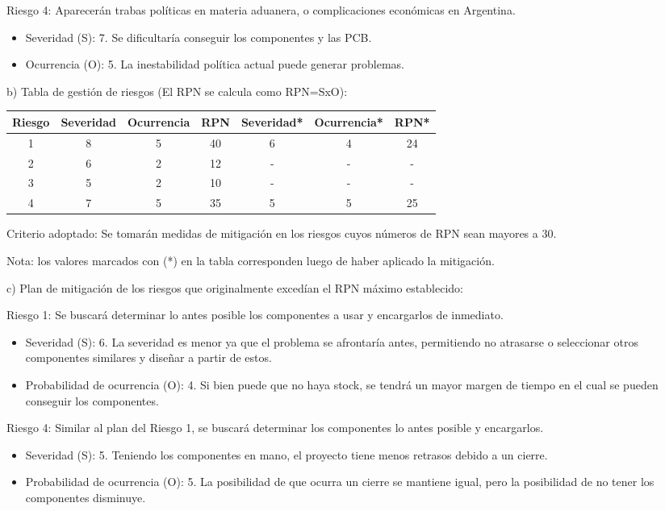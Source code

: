 \documentclass[
11pt, %
codirector, %
]{charter}
\begin{document}
Riesgo 4: Aparecerán trabas políticas en materia aduanera, o complicaciones económicas en Argentina.
\begin{itemize}
	\item Severidad (S): 7. Se dificultaría conseguir los componentes y las PCB.
	\item Ocurrencia (O): 5. La inestabilidad política actual puede generar problemas.
\end{itemize}

b) Tabla de gestión de riesgos (El RPN se calcula como RPN=SxO): 

\begin{table}[htpb]
\centering
\begin{tabular}{|c|c|c|c|c|c|c|}
\hline
\rowcolor[HTML]{C0C0C0} 
Riesgo & Severidad & Ocurrencia & RPN & Severidad* & Ocurrencia* & RPN* \\ \hline
    1  & 8  & 5  &  40   &  6  & 4   & 24     \\ \hline
    2  & 6  & 2  &  12   &  -  &  -  & -    \\ \hline
    3  & 5  & 2  &  10   &  -  &  -  & -     \\ \hline
    4  & 7  & 5  &  35   &  5  &  5  & 25     \\ \hline
\end{tabular}%
\end{table}

Criterio adoptado: 
Se tomarán medidas de mitigación en los riesgos cuyos números de RPN sean mayores a 30.

Nota: los valores marcados con (*) en la tabla corresponden luego de haber aplicado la mitigación.

c) Plan de mitigación de los riesgos que originalmente excedían el RPN máximo establecido:
 
Riesgo 1: Se buscará determinar lo antes posible los componentes a usar y encargarlos de inmediato.
\begin{itemize}
  \item Severidad (S): 6. La severidad es menor ya que el problema se afrontaría antes, permitiendo no atrasarse o seleccionar otros componentes similares y diseñar a partir de estos.
  \item Probabilidad de ocurrencia (O): 4. Si bien puede que no haya stock, se tendrá un mayor margen de tiempo en el cual se pueden conseguir los componentes.
\end{itemize}
  
Riesgo 4: Similar al plan del Riesgo 1, se buscará determinar los componentes lo antes posible y encargarlos.
\begin{itemize}
	\item Severidad (S): 5. Teniendo los componentes en mano, el proyecto tiene menos retrasos debido a un cierre.
  \item Probabilidad de ocurrencia (O): 5. La posibilidad de que ocurra un cierre se mantiene igual, pero la posibilidad de no tener los componentes disminuye.
\end{itemize}
\end{document}

